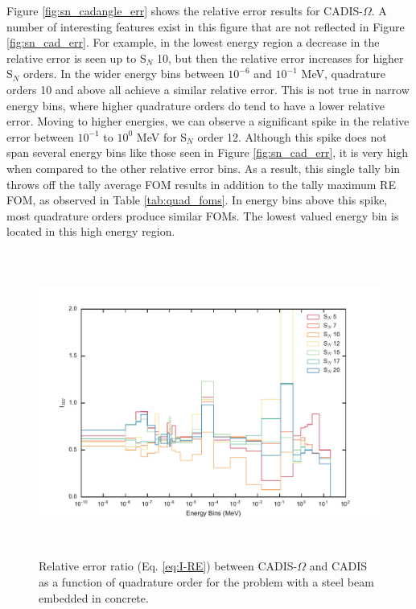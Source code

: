 Figure \ref{fig:sn_cadangle_err} shows the relative error results for
CADIS-$\Omega$. A number of interesting features exist in
this figure that are not reflected in Figure \ref{fig:sn_cad_err}. For example,
in the lowest energy region a decrease in the relative error is seen up to S$_N$
10, but then the relative error increases for higher S$_N$ orders. In the wider
energy bins between
$10^{-6}$ and $10^{-1}$ MeV, quadrature orders 10 and above all achieve a
similar relative error. This is not true in narrow energy bins, where higher
quadrature orders do tend to have a lower relative error. Moving to higher
energies, we can observe a significant spike in the relative error between
$10^{-1}$ to $10^{0}$ MeV for S$_N$ order 12. Although this spike does not span
several energy bins like those seen in Figure \ref{fig:sn_cad_err}, it is very
high when compared to the other relative error bins. As a result, this single
tally bin throws off the tally average FOM results in addition to the tally
maximum RE FOM, as observed in Table
\ref{tab:quad_foms}. In energy bins above this spike, most quadrature orders
produce similar FOMs. The lowest valued energy bin is located in this high
energy region.

\begin{figure}[h!]
  \centering
  \includegraphics[height=10cm]{./chapters/characterization_probs/figures/angle/prob_1/compare_err_quad.pdf}
  \caption[Relative error improvement factor (Eq. \eqref{eq:I-RE}) between CADIS-$\Omega$ and
  CADIS as a function of quadrature order for steel beam embedded in concrete.]
  {Relative error ratio (Eq. \eqref{eq:I-RE}) between CADIS-$\Omega$ and
   CADIS as a function of quadrature order for the problem with
   a steel beam embedded in concrete.}
  \label{fig:prob_1_quad_I_RE}
\end{figure}

